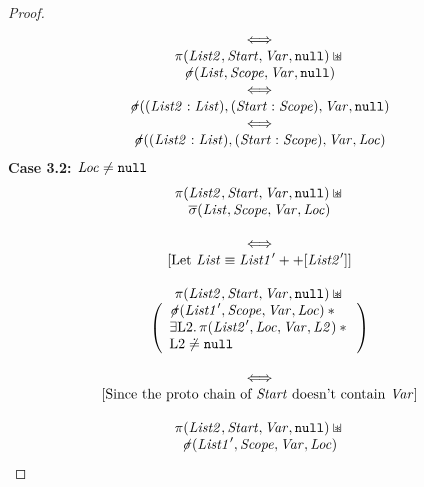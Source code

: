 \documentclass{article}
\begin{document}
\begin{lemma}
\begin{proof}
\[\begin{array}{c}
  \iff\\
  \pi({\mathit{List2}},{\mathit{Start}},{\mathit{Var}},\mbox{\texttt{{\upshape null}}}) \mathbin{\sqcup\mkern-10mu*} {}\\
  {\not\!\sigma}({\mathit{List}},{\mathit{Scope}},{\mathit{Var}},\mbox{\texttt{{\upshape null}}})\\
  \iff\\
  {\not\!\sigma}(({\mathit{List2}}:{\mathit{List}}),({\mathit{Start}}:{\mathit{Scope}}),{\mathit{Var}},\mbox{\texttt{{\upshape null}}})\\
  \iff\\
  {\not\!\sigma}(({\mathit{List2}}:{\mathit{List}}),({\mathit{Start}}:{\mathit{Scope}}),{\mathit{Var}},{\mathit{Loc}})
\end{array}
\]
                \textbf{Case 3.2: ${\mathit{Loc}}\neq\mbox{\texttt{{\upshape null}}}$}
\[
\begin{array}{c}
        \proto(\E{List2},\E{Start},\E{Var},\nil) \sepish {}\\
  \scopepr(\E{List},\E{Scope},\E{Var},\E{Loc})\\\\
  \iff \\
  \text{[Let $\E{List}\equiv\E{List1}'++[\E{List2}']$]}\\\\
  \proto(\E{List2},\E{Start},\E{Var},\nil) \sepish {}\\
  \left(\begin{array}{l}
          \notscope(\E{List1}',\E{Scope},\E{Var},\E{Loc}) \sep{}\\ 
          \exists\V{L2}\st\proto(\E{List2}',\E{Loc},\E{Var},\E{L2}) \sep{}\\
          \V{L2}\not\doteq\nil 
  \end{array}\right)\\\\
  \iff \\
  \text{[Since the proto chain of $\E{Start}$ doesn't contain $\E{Var}$]}\\\\
  \proto(\E{List2},\E{Start},\E{Var},\nil) \sepish {}\\
          \notscope(\E{List1}',\E{Scope},\E{Var},\E{Loc})%

\end{array}\]
\end{proof}
\end{lemma}
\end{document}
